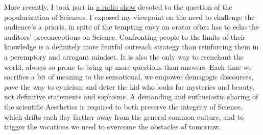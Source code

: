 \documentclass[a4paper,12pt,onecolumn]{article}
\begin{document}
\indent More recently, I took part in \href{https://www.mixcloud.com/faconde/faconde-s2e01-vulgarisation/}{a radio show} devoted to the question of the popularization of Sciences. I exposed my viewpoint on the need to challenge the audience's a prioris, in spite of the tempting envy an orator often has to echo the auditors' preconceptions on Science. Confronting people to the limits of their knowledge is a definitely more fruitful outreach strategy than reinforcing them in a peremptory and arrogant mindset. It is also the only way to reenchant the world, always so prone to bring up more questions than answers. Each time we sacrifice a bit of meaning to the sensational, we empower demagogic discourses, pave the way to cynicism and deter the kid who looks for mysteries and beauty, not definitive statements and sophisms. A demanding and enthusiastic sharing of the scientific Aesthetics is required to both preserve the integrity of Science, which drifts each day farther away from the general common culture, and to trigger the vocations we need to overcome the obstacles of tomorrow. 
\end{document}

